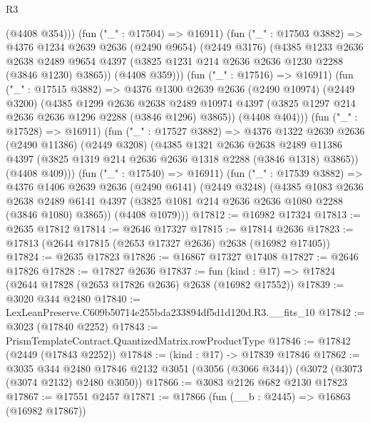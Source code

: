 \begin{lexlean}{R3}
\begin{coremodule}
                (@4408 @354)))
            (fun ("_" : @17504) => @16911)
            (fun ("_" : @17503 @3882) =>
            @4376
              @1234
              @2639
              @2636
              (@2490 @9654)
              (@2449 @3176)
              (@4385
                @1233
                @2636
                @2638
                @2489
                @9654
                @4397
                (@3825 @1231 @214 @2636 @2636 @1230 @2288 (@3846 @1230) @3865))
              (@4408 @359)))
          (fun ("_" : @17516) => @16911)
          (fun ("_" : @17515 @3882) =>
          @4376
            @1300
            @2639
            @2636
            (@2490 @10974)
            (@2449 @3200)
            (@4385
              @1299
              @2636
              @2638
              @2489
              @10974
              @4397
              (@3825 @1297 @214 @2636 @2636 @1296 @2288 (@3846 @1296) @3865))
            (@4408 @404)))
        (fun ("_" : @17528) => @16911)
        (fun ("_" : @17527 @3882) =>
        @4376
          @1322
          @2639
          @2636
          (@2490 @11386)
          (@2449 @3208)
          (@4385
            @1321
            @2636
            @2638
            @2489
            @11386
            @4397
            (@3825 @1319 @214 @2636 @2636 @1318 @2288 (@3846 @1318) @3865))
          (@4408 @409)))
      (fun ("_" : @17540) => @16911)
      (fun ("_" : @17539 @3882) =>
      @4376
        @1406
        @2639
        @2636
        (@2490 @6141)
        (@2449 @3248)
        (@4385
          @1083
          @2636
          @2638
          @2489
          @6141
          @4397
          (@3825 @1081 @214 @2636 @2636 @1080 @2288 (@3846 @1080) @3865))
        (@4408 @1079)))
@17812 := @16982 @17324
@17813 := @2635 @17812
@17814 := @2646 @17327
@17815 := @17814 @2636
@17823 := @17813 (@2644 @17815 (@2653 @17327 @2636) @2638 (@16982 @17405))
@17824 := @2635 @17823
@17826 := @16867 @17327 @17408
@17827 := @2646 @17826
@17828 := @17827 @2636
@17837 := fun (kind : @17) => @17824 (@2644 @17828 (@2653 @17826 @2636) @2638 (@16982 @17552))
@17839 := @3020 @344 @2480
@17840 := LexLeanPreserve.C609b50714e255bda233894df5d1d120d.R3.__fits_10
@17842 := @3023 (@17840 @2252)
@17843 := PrismTemplateContract.QuantizedMatrix.rowProductType
@17846 := @17842 (@2449 (@17843 @2252))
@17848 := (kind : @17) -> @17839 @17846
@17862 := @3035
    @344
    @2480
    @17846
    @2132
    @3051
    (@3056 (@3066 @344))
    (@3072 (@3073 (@3074 @2132) @2480 @3050))
@17866 := @3083 @2126 @682 @2130 @17823
@17867 := @17551 @2457
@17871 := @17866 (fun (__b : @2445) => @16863 (@16982 @17867))

\end{coremodule}
\end{lexlean}
